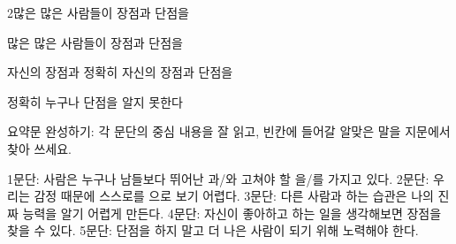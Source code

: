 \documentclass[fs12,seriesSau]{korfarm-base}
\begin{document}
\begin{kfSentenceUnit}{2}{많은 많은 사람들이 장점과 단점을}
\begin{kfChoices}
\kfChoice 많은
\kfChoice 많은 사람들이
\kfChoice 장점과
\kfChoice 단점을
\end{kfChoices}
\begin{kfChoices}
\kfChoice 자신의
\kfChoice 장점과
\kfChoice 정확히
\kfChoice 자신의 장점과 단점을
\end{kfChoices}
\begin{kfChoices}
\kfChoice 정확히
\kfChoice 누구나
\kfChoice 단점을
\kfChoice 알지 못한다
\end{kfChoices}
\end{kfSentenceUnit}

\kfActivityBg {}
\par{}\par\nopagebreak[4]\smallskip\nopagebreak[4]

\kfActivityBg \par{}\par\nopagebreak[4]\smallskip\nopagebreak[4]
\begin{kfBlankList}
\kfBlankItem 요약문 완성하기: 각 문단의 중심 내용을 잘 읽고, 빈칸에 들어갈 알맞은 말을 지문에서 찾아 쓰세요.

1문단: 사람은 누구나 남들보다 뛰어난 \kfFillBlank[42mm]{}과/와 고쳐야 할 \kfFillBlank[42mm]{}을/를 가지고 있다. 2문단: 우리는 감정 때문에 스스로를 \kfFillBlank[42mm]{}으로 보기 어렵다. 3문단: 다른 사람과 \kfFillBlank[42mm]{}하는 습관은 나의 진짜 능력을 알기 어렵게 만든다. 4문단: 자신이 좋아하고 \kfFillBlank[42mm]{} 하는 일을 생각해보면 장점을 찾을 수 있다. 5문단: 단점을 \kfFillBlank[42mm]{}하지 말고 더 나은 사람이 되기 위해 노력해야 한다.
\end{kfBlankList}

\kfActivityBg \par{}\par\nopagebreak[4]\smallskip\nopagebreak[4]
\end{document}
